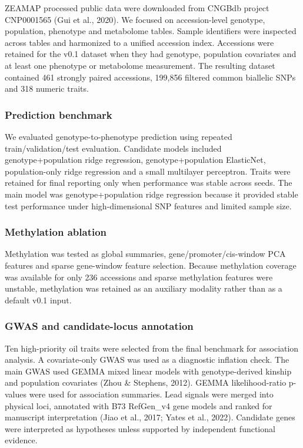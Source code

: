 \documentclass[
]{article}
\begin{document}
ZEAMAP processed public data were downloaded from CNGBdb project
CNP0001565 (Gui et al., 2020). We focused on accession-level genotype,
population, phenotype and metabolome tables. Sample identifiers were
inspected across tables and harmonized to a unified accession index.
Accessions were retained for the v0.1 dataset when they had genotype,
population covariates and at least one phenotype or metabolome
measurement. The resulting dataset contained 461 strongly paired
accessions, 199,856 filtered common biallelic SNPs and 318 numeric
traits.

\subsubsection{Prediction benchmark}\label{prediction-benchmark}

We evaluated genotype-to-phenotype prediction using repeated
train/validation/test evaluation. Candidate models included
genotype+population ridge regression, genotype+population ElasticNet,
population-only ridge regression and a small multilayer perceptron.
Traits were retained for final reporting only when performance was
stable across seeds. The main model was genotype+population ridge
regression because it provided stable test performance under
high-dimensional SNP features and limited sample size.

\subsubsection{Methylation ablation}\label{methylation-ablation}

Methylation was tested as global summaries, gene/promoter/cis-window PCA
features and sparse gene-window feature selection. Because methylation
coverage was available for only 236 accessions and sparse methylation
features were unstable, methylation was retained as an auxiliary
modality rather than as a default v0.1 input.

\subsubsection{GWAS and candidate-locus
annotation}\label{gwas-and-candidate-locus-annotation}

Ten high-priority oil traits were selected from the final benchmark for
association analysis. A covariate-only GWAS was used as a diagnostic
inflation check. The main GWAS used GEMMA mixed linear models with
genotype-derived kinship and population covariates (Zhou \& Stephens,
2012). GEMMA likelihood-ratio p-values were used for association
summaries. Lead signals were merged into physical loci, annotated with
B73 RefGen\_v4 gene models and ranked for manuscript interpretation
(Jiao et al., 2017; Yates et al., 2022). Candidate genes were
interpreted as hypotheses unless supported by independent functional
evidence.
\end{document}
